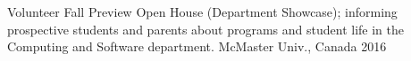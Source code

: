 

\begin{cvhonors}


  \cvhonor
    {Volunteer} %
    {Fall Preview Open House (Department Showcase); informing prospective students and parents about programs and student life in the Computing and Software department.} %
    {McMaster Univ., Canada} %
    {2016} %

\end{cvhonors}

